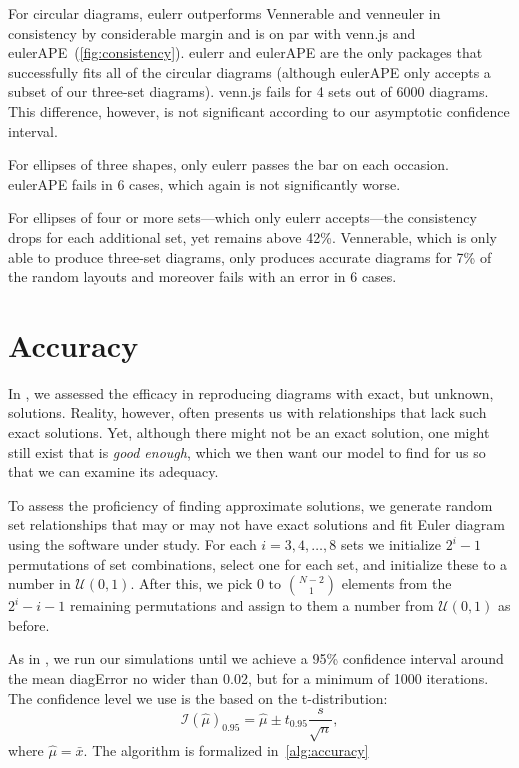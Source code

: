 \documentclass[
  oneside,
  openany,
  numbers=noendperiod,
  parskip=half,
  bibliography=totoc
]{scrbook}\usepackage[]{graphicx}\usepackage{xcolor}
\newcommand{\pkg}[1]{{\fontseries{b}\selectfont #1}}
\begin{document}
For circular diagrams, \pkg{eulerr} outperforms \pkg{Vennerable} and \pkg{venneuler} in
consistency by considerable margin and is on par with \pkg{venn.js} and
\pkg{eulerAPE}~(\cref{fig:consistency}). \pkg{eulerr} and \pkg{eulerAPE} are
the only packages that successfully fits all of the circular diagrams (although
\pkg{eulerAPE} only accepts a subset of our three-set diagrams). \pkg{venn.js}
fails for 4 sets out of
6000 diagrams. This difference,
however, is not significant according to our asymptotic confidence interval.

For ellipses of three shapes, only \pkg{eulerr} passes the bar on each
occasion. \pkg{eulerAPE} fails in
6
cases, which again is not significantly worse.

For ellipses of four or more sets---which only \pkg{eulerr} accepts---the
consistency drops for each additional set, yet remains above
42\%. \pkg{Vennerable}, which
is only able to produce three-set diagrams, only produces accurate diagrams for
7\% of the random layouts and moreover
fails with an error in 6 cases.

\section{Accuracy}
\label{sec:accuracy}

In , we assessed the efficacy in reproducing diagrams
with exact, but unknown, solutions. Reality, however, often presents us with
relationships that lack such exact solutions. Yet, although there might not be an
exact solution, one might still exist that is \emph{good enough},
which we then want our model to find for us so that we can examine
its adequacy.

To assess the proficiency of finding approximate solutions,
we generate random set relationships that may or may not have
exact solutions and fit Euler diagram using the software under study. For each
$i=3,4,\dots,8$ sets we initialize $2^i-1$ permutations of set combinations,
select one for each set, and initialize these to a number in
$\mathcal{U}(0, 1)$. After this, we pick $0 \text{ to } \binom{N-2}{1}$ elements
from the $2^i-i-1$ remaining permutations and assign to them a number from
$\mathcal{U}(0, 1)$ as before.

As in , we run our simulations until we achieve
a 95\% confidence interval around the mean diagError no wider than 0.02,
but for a minimum of 1000 iterations. The confidence level we use is the
based on the t-distribution:
\begin{equation}
\mathcal{I}(\hat{\mu})_{0.95} = \hat{\mu} \pm t_{0.95}\frac{s}{\sqrt{n}},
\end{equation}
where $\hat{\mu} = \bar{x}$. The algorithm is formalized in~\autoref{alg:accuracy}
\end{document}
